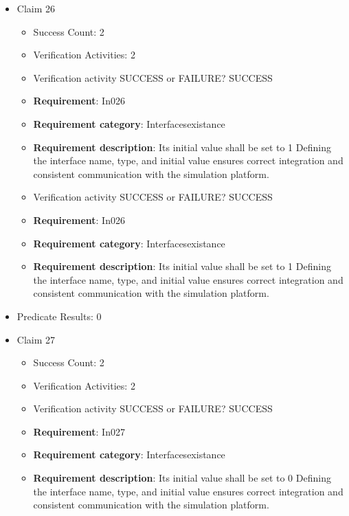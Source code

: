 \documentclass{article}
\begin{document}
\begin{itemize}
  				  \item Claim 26
				\begin{itemize}
			    	\item Success Count: 2 
			    	\item Verification Activities: 2
					\item Verification activity SUCCESS or FAILURE? SUCCESS
		
						\item \textbf{Requirement}: In026 
						\item \textbf{Requirement category}: Interfacesexistance 
						\item \textbf{Requirement description}: Its initial value shall be set to 1 Defining the interface name, type, and initial value ensures correct integration and consistent communication with the simulation platform.
					
					\item Verification activity SUCCESS or FAILURE? SUCCESS
		
						\item \textbf{Requirement}: In026 
						\item \textbf{Requirement category}: Interfacesexistance 
						\item \textbf{Requirement description}: Its initial value shall be set to 1 Defining the interface name, type, and initial value ensures correct integration and consistent communication with the simulation platform.
					
				\end{itemize}
				
									    
				\item Predicate Results: 0

  				  \item Claim 27
				\begin{itemize}
			    	\item Success Count: 2 
			    	\item Verification Activities: 2
					\item Verification activity SUCCESS or FAILURE? SUCCESS
		
						\item \textbf{Requirement}: In027 
						\item \textbf{Requirement category}: Interfacesexistance 
						\item \textbf{Requirement description}: Its initial value shall be set to 0 Defining the interface name, type, and initial value ensures correct integration and consistent communication with the simulation platform.
					

\end{itemize}
\end{itemize}
\end{document}
